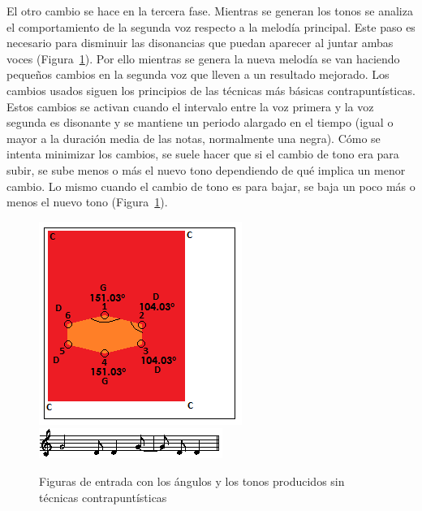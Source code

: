 El otro cambio se hace en la tercera fase. Mientras se generan los tonos se analiza el comportamiento de la segunda voz respecto a la melodía principal. Este paso es necesario para disminuir las disonancias que puedan aparecer al juntar ambas voces (Figura~\ref{fig:Figura3Voz2}). Por ello mientras se genera la nueva melodía se van haciendo pequeños cambios en la segunda voz que lleven a un resultado mejorado. Los cambios usados siguen los principios de las técnicas más básicas contrapuntísticas. Estos cambios se activan cuando el intervalo entre la voz primera y la voz segunda es disonante y se mantiene un periodo alargado en el tiempo (igual o mayor a la duración media de las notas, normalmente una negra). Cómo se intenta minimizar los cambios, se suele hacer que si el cambio de tono era para subir, se sube menos o más el nuevo tono dependiendo de qué implica un menor cambio. Lo mismo cuando el cambio de tono es para bajar, se baja un poco más o menos el nuevo tono (Figura~\ref{fig:Figura3Voz2}).

		\begin{figure}[htbp]
		\centering
		\hspace*{0.0in}
		\includegraphics[scale=1]{graphics/simpletest4-F3.png}
		\includegraphics[scale=1]{graphics/simpletest4-F3-MEL2partitura.png}
		\caption{Figuras de entrada con los ángulos y los tonos producidos sin técnicas contrapuntísticas}
		\label{fig:Figura3Voz2}
		\end{figure}


